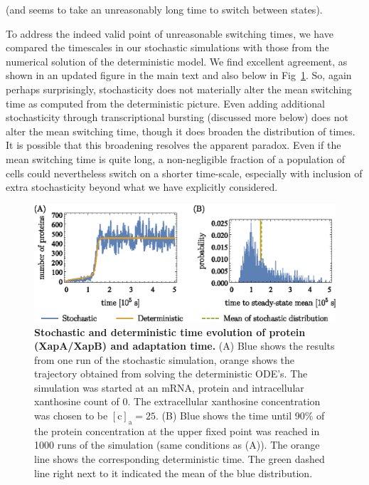 \documentclass[11pt,letterpaper]{article}
\begin{document}
\begin{review}
	(and seems to take an unreasonably long time to switch between states).
\end{review}

\begin{response}
To address the indeed valid point of unreasonable switching times, we
have compared the timescales in our stochastic simulations with those from the
numerical solution of the deterministic model. We find excellent
agreement, as shown in an updated figure in the main text and also below
in Fig~\ref{adaptationtime}. So, again perhaps surprisingly,
stochasticity does not materially alter the mean switching time as
computed from the deterministic picture. Even adding additional
stochasticity through transcriptional bursting (discussed more below)
does not alter the mean switching time, though it does broaden the
distribution of times.
It is possible that this broadening resolves the apparent paradox. Even
if the mean switching time is quite long, a non-negligible fraction of a
population of cells could nevertheless switch on a shorter time-scale,
especially with inclusion of extra stochasticity beyond what we have
explicitly considered.
\end{response}

	\begin{figure}[h!]
		\centering
		\includegraphics{Fig9_evolution.eps}
		\caption{{\bf Stochastic and deterministic time evolution of protein (XapA/XapB) and adaptation time.}
			(A) Blue shows the results from one run of the stochastic simulation, orange shows the trajectory obtained from solving the deterministic ODE's. The simulation was started
			at an mRNA, protein and intracellular xanthosine count of 0. The
			extracellular xanthosine concentration was chosen to be
			$\mathrm{[c]_a} = 25$. (B) Blue shows the time until 90\% of the protein concentration at the upper fixed point was reached in 1000 runs of the simulation (same conditions as (A)). The orange line shows the corresponding deterministic time. The green dashed line right next to it indicated the mean of the blue distribution.}
		\label{adaptationtime}
	\end{figure}
\end{document}
